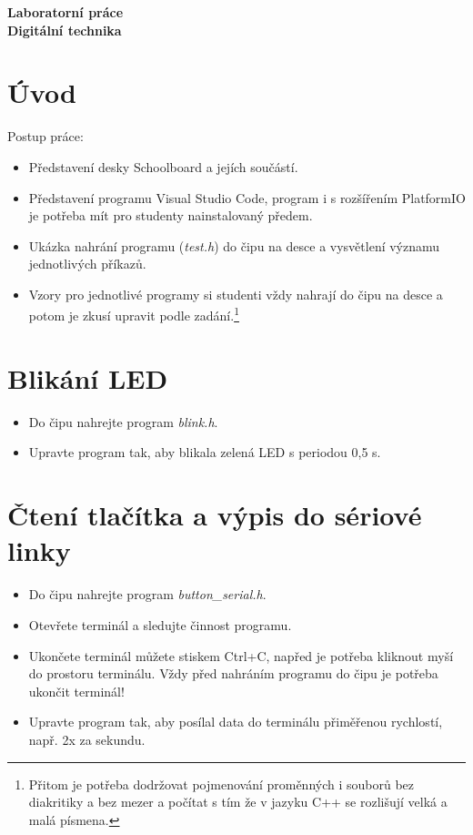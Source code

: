 \documentclass[12pt]{article}
\begin{document}
\begin{center}
	\large \textbf{Laboratorní práce} \\  
	\Huge \textbf{Digitální technika} 
\end{center}

\section{Úvod}

Postup práce: 
\begin{itemize}
	\item Představení desky Schoolboard a jejích součástí. 
	\item Představení programu Visual Studio Code, program i s rozšířením PlatformIO je potřeba mít pro studenty nainstalovaný předem. 
	\item Ukázka nahrání programu (\textit{test.h}) do čipu na desce a vysvětlení významu jednotlivých příkazů. 
	\item Vzory pro jednotlivé programy si studenti vždy nahrají do čipu na desce a potom je zkusí upravit podle 
	zadání.\footnote{Přitom je potřeba dodržovat pojmenování proměnných i souborů bez diakritiky a bez mezer 
	a počítat s tím že v jazyku C++ se rozlišují velká a malá písmena. } 
	
\end{itemize}

\section{Blikání LED}

\begin{itemize} 
	\item Do čipu nahrejte program \textit{blink.h}. 
	\item Upravte program tak, aby blikala zelená LED s periodou 0,5 s. 
\end{itemize} 

\section{Čtení tlačítka a výpis do sériové linky}

\begin{itemize} 
	\item Do čipu nahrejte program \textit{button\_serial.h}.
	\item Otevřete terminál a sledujte činnost programu.  
	\item Ukončete terminál můžete stiskem Ctrl+C, napřed je potřeba kliknout myší do prostoru terminálu. 
	Vždy před nahráním programu do čipu je potřeba ukončit terminál!
	\item Upravte program tak, aby posílal data do terminálu přiměřenou rychlostí, např. 2x za sekundu. 
\end{itemize} 
\end{document}
